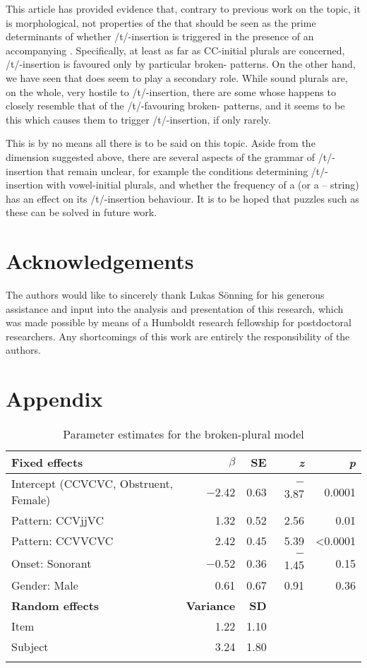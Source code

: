 \documentclass[output=paper]{langsci/langscibook}
\begin{document}
This article has provided evidence that, contrary to previous work on the topic, it is morphological, not  properties of the  that should be seen as the prime determinants of whether /t/-insertion is triggered in the presence of an accompanying . Specifically, at least as far as CC-initial plurals are concerned, /t/-insertion is favoured only by particular broken- patterns. On the other hand, we have seen that  does seem to play a secondary role. While sound plurals are, on the whole, very hostile to /t/-insertion, there are some whose  happens to closely resemble that of the /t/-favouring broken- patterns, and it seems to be this which causes them to trigger /t/-insertion, if only rarely.

This is by no means all there is to be said on this topic. Aside from the  dimension suggested above, there are several aspects of the grammar of /t/-insertion that remain unclear, for example the conditions determining /t/-insertion with vowel-initial plurals, and whether the frequency of a  (or a – string) has an effect on its /t/-insertion behaviour. It is to be hoped that puzzles such as these can be solved in future work.

  
\section*{Acknowledgements}
The authors would like to sincerely thank Lukas Sönning for his generous assistance and input into the analysis and presentation of this research, which was made possible by means of a Humboldt research fellowship for postdoctoral researchers. Any shortcomings of this work are entirely the responsibility of the authors.

\section*{Appendix}
\begin{table}
\begin{tabularx}{\textwidth}{X rrrr}
\lsptoprule
\textbf{Fixed effects} & \bfseries $\beta $ & \textbf{SE} & \textbf{\textit{z}} & \textbf{\textit{p}}\\
\midrule
Intercept (CCVCVC, Obstruent, Female) &$-$2.42 & 0.63 &$-$3.87 & 0.0001\\
Pattern: CCVjjVC &1.32 & 0.52 &2.56 & 0.01\\
Pattern: CCVVCVC &2.42 & 0.45 &5.39 & <0.0001\\
Onset: Sonorant &$-$0.52 & 0.36 &$-$1.45 & 0.15\\
Gender: Male &0.61 & 0.67 &0.91 & 0.36\\
\tablevspace
\midrule
\textbf{Random effects} & \textbf{Variance} & \textbf{SD} &  & \\
\midrule
Item & 1.22 & 1.10 &  & \\
Subject & 3.24 & 1.80 &  & \\
\lspbottomrule
\end{tabularx}
\caption{Parameter estimates for the broken-plural model}
\end{table}
\end{document}
